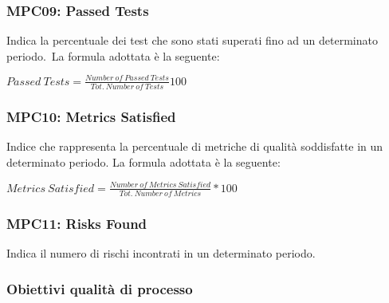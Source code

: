 \subsubsection{MPC09: Passed Tests}\label{sssec:passed_tests}
Indica la percentuale dei test che sono stati superati fino ad un determinato periodo.\
La formula adottata è la seguente:
\begin{center}
    $Passed\ Tests = \displaystyle \frac{Number\ of\ Passed\ Tests}{Tot.\ Number\ of\ Tests}100$
\end{center}

\subsubsection{MPC10: Metrics Satisfied}\label{sssec:metrics_satisfied}
Indice che rappresenta la percentuale di metriche di qualità soddisfatte in un determinato periodo.
La formula adottata è la seguente:
\begin{center}
    $Metrics\ Satisfied = \displaystyle \frac{Number\ of\ Metrics\ Satisfied}{Tot.\ Number\ of\ Metrics}*100$
\end{center}

\subsubsection{MPC11: Risks Found}\label{sssec:risks_found}
Indica il numero di rischi incontrati in un determinato periodo.
\subsubsection{Obiettivi qualità di processo}
        \renewcommand{\arraystretch}{1.8}


